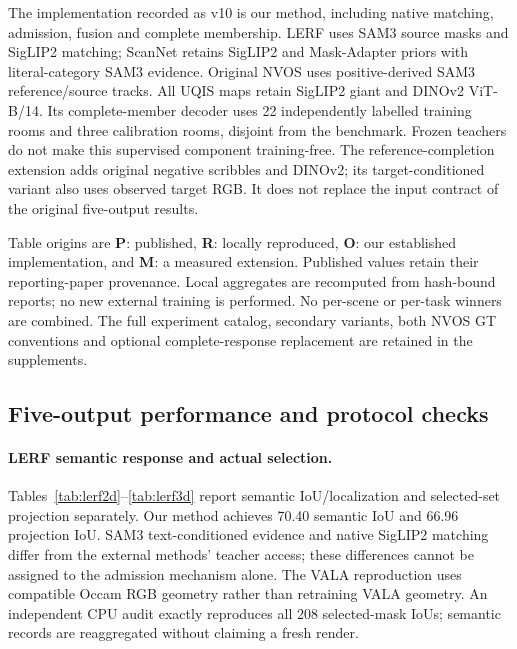 The implementation recorded as v10 is our method, including native matching,
admission, fusion and complete membership. LERF uses SAM3 source masks and
SigLIP2 matching; ScanNet retains SigLIP2 and Mask-Adapter priors with
literal-category SAM3 evidence. Original NVOS uses positive-derived SAM3
reference/source tracks. All UQIS maps retain SigLIP2 giant and DINOv2 ViT-B/14.
Its complete-member decoder uses 22 independently labelled training rooms and
three calibration rooms, disjoint from the benchmark. Frozen teachers do not
make this supervised component training-free. The reference-completion
extension adds original negative scribbles and DINOv2; its target-conditioned
variant also uses observed target RGB. It does not replace the input contract
of the original five-output results.

Table origins are \textbf{P}: published, \textbf{R}: locally reproduced,
\textbf{O}: our established implementation, and \textbf{M}: a measured extension.
Published values retain their reporting-paper provenance. Local aggregates
are recomputed from hash-bound reports; no new external training is performed.
No per-scene or per-task winners are combined. The full experiment catalog,
secondary variants, both NVOS GT conventions and optional complete-response
replacement are retained in the supplements.

\subsection{Five-output performance and protocol checks}
\paragraph{LERF semantic response and actual selection.}
Tables~\ref{tab:lerf2d}--\ref{tab:lerf3d} report semantic IoU/localization and
selected-set projection separately. Our method achieves 70.40 semantic IoU
and 66.96 projection IoU. SAM3 text-conditioned evidence and native SigLIP2
matching differ from the external methods' teacher access; these differences
cannot be assigned to the admission mechanism alone. The VALA reproduction
uses compatible Occam RGB geometry rather than retraining VALA geometry.
An independent CPU audit exactly reproduces all 208 selected-mask IoUs;
semantic records are reaggregated without claiming a fresh render.
\begin{table}[ht]
\centering\small
\caption{LERF-2D. Published context from VALA Table 1~\cite{vala}.
Localization is peak-in-box accuracy, not ranking AP. Teacher access differs.}
\label{tab:lerf2d}
\end{table}
\begin{table}[ht]
\centering\small
\caption{LERF selected-Gaussian projection, using 2D masks as GT.
Acc.@0.25 counts projections with IoU above 0.25. Published values from
VALA Table 1~\cite{vala}; its local reproduction uses compatible RGB geometry.}
\label{tab:lerf3d}
\end{table}

